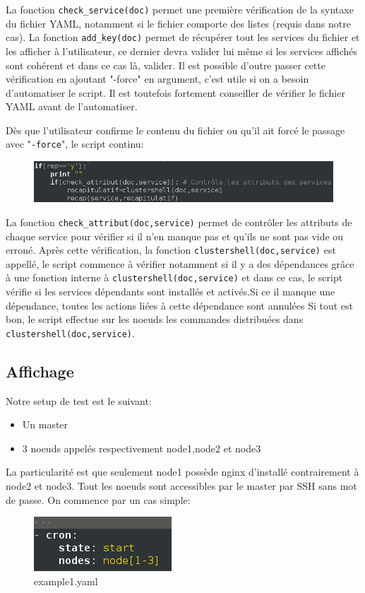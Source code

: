 \documentclass[a4paper,11pt]{article}
\begin{document}
La fonction \verb?check_service(doc)? permet une première vérification de la syntaxe du fichier YAML, notamment si le fichier comporte des listes (requis dans notre cas).
\smallbreak
La fonction \verb?add_key(doc)? permet de récupérer tout les services du fichier et les afficher à l'utilisateur, ce dernier devra valider lui même si les services affichés sont cohérent et dans ce cas là, valider. Il est possible d'outre passer cette vérification en ajoutant "-force" en argument, c'est utile si on a besoin d'automatiser le script. Il est toutefois fortement conseiller de vérifier le fichier YAML avant de l'automatiser. 

\pagebreak

Dès que l'utilisateur confirme le contenu du fichier ou qu'il ait forcé le passage avec "\verb?-force?", le script continu: 
\smallbreak
\begin{figure}[hbtp]
\centering
\includegraphics[scale=0.7]{clustershell_yaml.png}
\end{figure}
\smallbreak


La fonction \verb?check_attribut(doc,service)? permet de contrôler les attributs de chaque service pour vérifier si il n'en manque pas et qu'ils ne sont pas vide ou erroné.
\smallbreak
Après cette vérification, la fonction \verb?clustershell(doc,service)? est appellé, le script commence à vérifier notamment si il y a des dépendances grâce à une fonction interne à \verb?clustershell(doc,service)?  et dans ce cas, le script vérifie si les services dépendants sont installés et activés.Si ce il manque une dépendance, toutes les actions liées à cette dépendance sont annulées Si tout est bon, le script effectue sur les noeuds les commandes distribuées dans \verb?clustershell(doc,service)?.


\subsection{Affichage}
\label{sub:4.5}

Notre setup de test est le suivant: 
\begin{itemize}
\item Un master
\item 3 noeuds appelés respectivement node1,node2 et node3
\end{itemize}
La particularité est que seulement node1 possède nginx d'installé contrairement à node2 et node3.
\smallbreak
Tout les noeuds sont accessibles par le master par SSH sans mot de passe.
On commence par un cas simple:
\smallbreak
\begin{figure}[hbtp]
\centering
\includegraphics[scale=0.7]{example1_yaml.png}
\caption{example1.yaml}
\end{figure}
\end{document}
